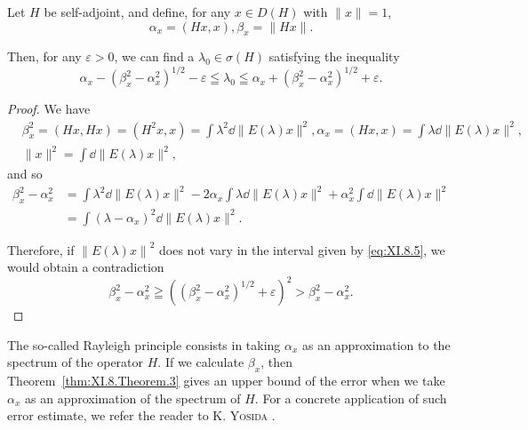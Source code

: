 \begin{theorem}\label{thm:XI.8.Theorem.3} Let $H$ be self-adjoint, and define, for any $x \in D(H)$ with $\| x \| = 1$, 
\begin{equation}\label{eq:XI.8.4}
\alpha_{x} = (H x, x), \beta_{x} = \| H x \|.
\end{equation}
\end{theorem}

Then, for any $\varepsilon > 0$, we can find a $\lambda_0 \in \sigma(H)$ satisfying the inequality 
\begin{equation}\label{eq:XI.8.5}
\alpha_{x} - (\beta_{x} ^{2} - \alpha_{x} ^{2}) ^{1/2} - \varepsilon \leqq \lambda_{0} \leqq \alpha_{x} + (\beta_{x} ^{2} - \alpha_{x} ^{2}) ^{1/2} + \varepsilon .
\end{equation}

\begin{proof}
 We have 
\[
\begin{aligned}
&\beta_{x} ^{2} = (H x, H x) = (H ^{2} x, x) = \int \lambda^{2} \dd \| E (\lambda) x \| ^{2}, \alpha_{x} = (H x, x) = \int \lambda \dd \| E (\lambda) x \| ^{2},
\\
&\| x \| ^{2} = \int \dd \| E (\lambda) x \| ^{2},
\end{aligned}
\]
and so 
\[ \begin{aligned} \beta_{x} ^{2} - \alpha_{x} ^{2} & = \int \lambda^{2} \dd \| E (\lambda) x \| ^{2} - 2 \alpha_{x} \int \lambda \dd \| E (\lambda) x \| ^{2} + \alpha_{x} ^{2} \int \dd \| E (\lambda) x \| ^{2} \\ & = \int (\lambda - \alpha_{x}) ^{2} \dd \| E (\lambda) x \| ^{2}. \end{aligned}
\]

Therefore, if $\left\|E(\lambda)x\right\|^{2}$ does not vary in the interval given by \eqref{eq:XI.8.5}, we would obtain a contradiction 
\[
\beta_{x} ^{2} - \alpha_{x} ^{2} \geqq ((\beta_{x} ^{2} - \alpha_{x} ^{2}) ^{1/2} + \varepsilon) ^{2} > \beta_{x} ^{2} - \alpha_{x} ^{2}.
\]
\end{proof}
\begin{remarku} The so-called Rayleigh principle consists in taking $\alpha_{x}$ as an approximation to the spectrum of the operator $H$. If we calculate $\beta_{x}$, then Theorem~\ref{thm:XI.8.Theorem.3} gives an upper bound of the error when we take $\alpha_{x}$ as an approximation of the spectrum of $H$. For a concrete application of such error estimate, we refer the reader to K. \textsc{Yosida} \cite{yosida344}. 
\end{remarku}

